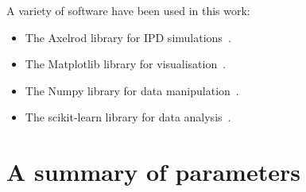 \documentclass{article}
\begin{document}
A variety of software have been used in this work:

\begin{itemize}
    \item The Axelrod library for IPD simulations~\cite{axelrodproject}.
    \item The Matplotlib library for visualisation~\cite{hunter2007matplotlib}.
    \item The Numpy library for data manipulation~\cite{walt2011numpy}.
    \item The scikit-learn library for data analysis~\cite{scikit-learn}.
\end{itemize}

\appendix

\section{A summary of parameters}\label{app:parameters}
\end{document}
